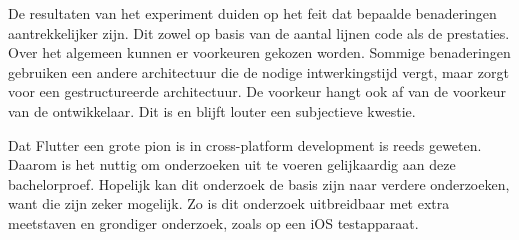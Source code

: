 De resultaten van het experiment duiden op het feit dat bepaalde benaderingen aantrekkelijker zijn. Dit zowel op basis van de aantal lijnen code als de prestaties. Over het algemeen kunnen er voorkeuren gekozen worden. Sommige benaderingen gebruiken een andere architectuur die de nodige intwerkingstijd vergt, maar zorgt voor een gestructureerde architectuur. De voorkeur hangt ook af van de voorkeur van de ontwikkelaar. Dit is en blijft louter een subjectieve kwestie.\newline

Dat Flutter een grote pion is in cross-platform development is reeds geweten. Daarom is het nuttig om onderzoeken uit te voeren gelijkaardig aan deze bachelorproef. Hopelijk kan dit onderzoek de basis zijn naar verdere onderzoeken, want die zijn zeker mogelijk. Zo is dit onderzoek uitbreidbaar met extra meetstaven en grondiger onderzoek, zoals op een iOS testapparaat.
